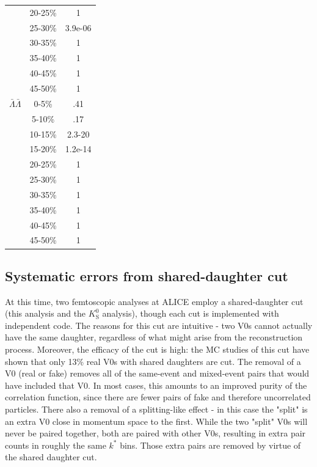 \begin{table}
\begin{minipage}{18pc}
\begin{center}
\begin{tabular}{| c | c | c |}
   & 20-25\% & 1 \\
   & 25-30\% & 3.9e-06 \\
   & 30-35\% & 1 \\
   & 35-40\% & 1 \\
   & 40-45\% & 1 \\
   & 45-50\% & 1 \\
   \hline
  $\bar{\Lambda}\bar{\Lambda}$ &  0-5\% & .41 \\
   & 5-10\% & .17 \\
   & 10-15\% & 2.3-20 \\
   & 15-20\% & 1.2e-14 \\
   & 20-25\% & 1 \\
   & 25-30\% & 1 \\
   & 30-35\% & 1 \\
   & 35-40\% & 1 \\
   & 40-45\% & 1 \\
   & 45-50\% & 1 \\
   \hline 
\end{tabular}
\end{center}
\end{minipage}
\end{table}

\subsection{Systematic errors from shared-daughter cut}

At this time, two femtoscopic analyses at ALICE employ a shared-daughter cut (this analysis and the $K^0_\mathrm{S}$ analysis), though each cut is implemented with independent code.  The reasons for this cut are intuitive - two V0s cannot actually have the same daughter, regardless of what might arise from the reconstruction process.  Moreover, the efficacy of the cut is high: the MC studies of this cut have shown that only 13\% real V0s with shared daughters are cut.  The removal of a V0 (real or fake) removes all of the same-event and mixed-event pairs that would have included that V0.  In most cases, this amounts to an improved purity of the correlation function, since there are fewer pairs of fake and therefore uncorrelated particles.  There also a removal of a splitting-like effect - in this case the "split" is an extra V0 close in momentum space to the first.  While the two "split" V0s will never be paired together, both are paired with other V0s, resulting in extra pair counts in roughly the same $k^*$ bins.  Those extra pairs are removed by virtue of the shared daughter cut.

